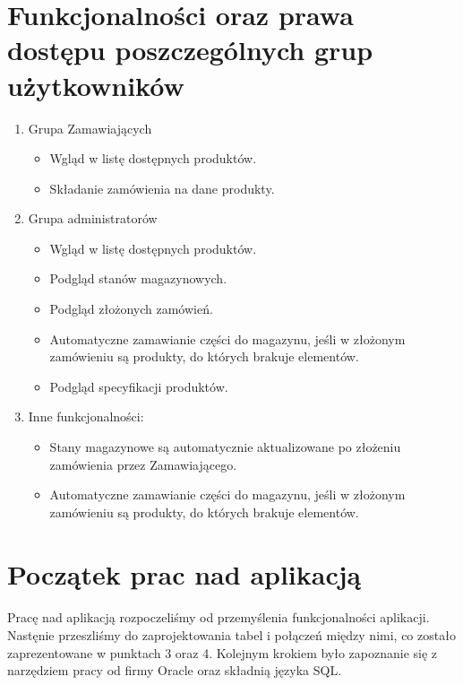 \documentclass{article}
\begin{document}
\section{Funkcjonalności oraz prawa dostępu poszczególnych grup użytkowników}
\begin{enumerate}
   \item Grupa Zamawiających
         \begin{itemize}
            \item Wgląd w listę dostępnych produktów.
            \item Składanie zamówienia na dane produkty.
         \end{itemize}
   \item Grupa administratorów
         \begin{itemize}
            \item Wgląd w listę dostępnych produktów.
            \item Podgląd stanów magazynowych.
            \item Podgląd złożonych zamówień.
            \item Automatyczne zamawianie części do magazynu, jeśli w złożonym
                  zamówieniu są produkty, do których brakuje elementów.
            \item Podgląd specyfikacji produktów.
         \end{itemize}
   \item Inne funkcjonalności:
         \begin{itemize}
            \item Stany magazynowe są automatycznie aktualizowane po złożeniu
                  zamówienia przez Zamawiającego.
            \item Automatyczne zamawianie części do magazynu, jeśli w złożonym
                  zamówieniu są produkty, do których brakuje elementów.
         \end{itemize}
\end{enumerate}
\newpage
\section{Początek prac nad aplikacją}
\paragraph{}
Pracę nad aplikacją rozpoczeliśmy od przemyślenia funkcjonalności aplikacji.
Nastęnie przeszliśmy do zaprojektowania tabel i połączeń między
nimi, co zostało zaprezentowane w punktach 3 oraz 4. Kolejnym krokiem było
zapoznanie się z narzędziem pracy od firmy Oracle oraz składnią języka SQL.
\end{document}
